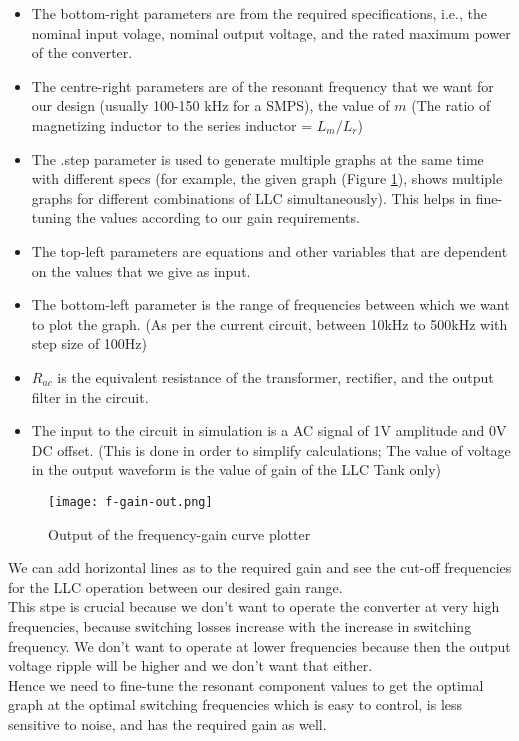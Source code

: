 \begin{itemize}
    \item The bottom-right parameters are from the required specifications, i.e., the nominal input volage, nominal output voltage, and the rated maximum power of the converter.
    \item The centre-right parameters are of the resonant frequency that we want for our design (usually 100-150 kHz for a SMPS), the value of $m$ (The ratio of magnetizing inductor to the series inductor = $L_m / L_r$)
    \item The .step parameter is used to generate multiple graphs at the same time with different specs (for example, the given graph (Figure \ref*{fig:f-gain-out}), shows multiple graphs for different combinations of LLC simultaneously). This helps in fine-tuning the values according to our gain requirements.
    \item The top-left parameters are equations and other variables that are dependent on the values that we give as input.
    \item The bottom-left parameter is the range of frequencies between which we want to plot the graph. (As per the current circuit, between 10kHz to 500kHz with step size of 100Hz)
    \item $R_{ac}$ is the equivalent resistance of the transformer, rectifier, and the output filter in the circuit.
    \item The input to the circuit in simulation is a AC signal of 1V amplitude and 0V DC offset. (This is done in order to simplify calculations; The value of voltage in the output waveform is the value of gain of the LLC Tank only)
\end{itemize}
\begin{figure}[H]
    \centering
    \texttt{[image: f-gain-out.png]}
    \caption{Output of the frequency-gain curve plotter}
    \label{fig:f-gain-out}
\end{figure}
We can add horizontal lines as to the required gain and see the cut-off frequencies for the LLC operation between our desired gain range.\\
\noindent
This stpe is crucial because we don't want to operate the converter at very high frequencies, because switching losses increase with the increase in switching frequency. We don't want to operate at lower frequencies because then the output voltage ripple will be higher and we don't want that either.\\
\noindent
Hence we need to fine-tune the resonant component values to get the optimal graph at the optimal switching frequencies which is easy to control, is less sensitive to noise, and has the required gain as well.
